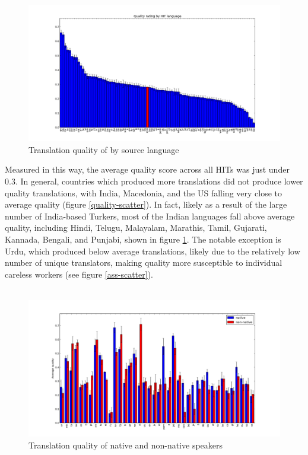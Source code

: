 \documentclass[11pt]{article}
\begin{document}
\begin{figure}[h]
\centering
\includegraphics[width=6in]{figures/quality-hitlang}
\caption{Translation quality of by source language}
\label{hitlangqual-bar}
\end{figure}

Measured in this way, the average quality score across all HITs was just under 0.3. In general, countries which produced more translations did not produce lower quality translations, with India, Macedonia, and the US falling very close to average quality (figure \ref{quality-scatter}). In fact, likely as a result of the large number of India-based Turkers, most of the Indian languages fall above average quality, including Hindi, Telugu, Malayalam, Marathis, Tamil, Gujarati, Kannada, Bengali, and Punjabi, shown in figure \ref{hitlangqual-bar}. The notable exception is Urdu, which produced below average translations, likely due to the relatively low number of unique translators, making quality more susceptible to individual careless workers (see figure \ref{ass-scatter}). \\\\

\begin{figure}[h]
\centering
\includegraphics[width=6in]{figures/quality-natlang-sorted}
\caption{Translation quality of native and non-native speakers}
\label{natlangqual-bar}
\end{figure}
\end{document}
